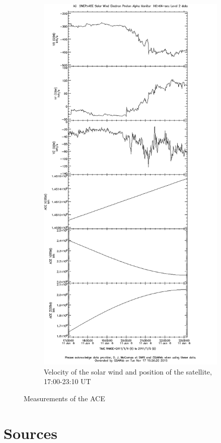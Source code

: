 \documentclass[10pt,a4paper]{article}
\begin{document}
\begin{figure}[h]
\begin{subfigure}[h]{.5\textwidth}
		\includegraphics[width=.8\linewidth]{ace-17-2310-v-s.png}
		\caption{Velocity of the solar wind and position of the satellite, 17:00-23:10 UT}
		\label{ace3}
	\end{subfigure}
	\caption{Measurements of the ACE}
	\label{ace}
\end{figure}







\section{Sources}
\end{document}
